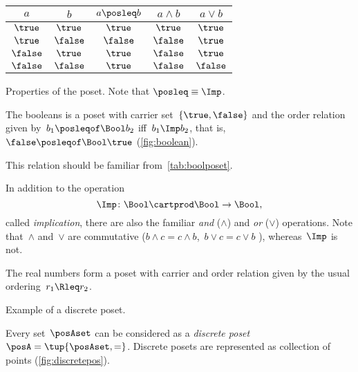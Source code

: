 \begin{margintable}
	\centering
	\begin{tabular}{cc|ccc}
		$a$      & $b$      & $a \posleq  b$ & $a \wedge b$ & $a \vee b$ \\ \hline
		$\true$  & $\true$  & $\true$        & $\true$      & $\true$    \\
		$\true$  & $\false$ & $\false$       & $\false$     & $\true$    \\
		$\false$ & $\true$  & $\true$        & $\false$     & $\true$    \\
		$\false$ & $\false$ & $\true$        & $\false$     & $\false$
	\end{tabular}
	\caption{Properties of the \Bool poset.
		Note that $\posleq \equiv \Imp$.
	}
	\label{tab:boolposet}
\end{margintable}

\begin{example}[Booleans]
	\label{ex:bool}
	The booleans \index{\Bool} is a poset with carrier set~$\{\true,\false\}$ and the order relation given by~$b_1 \posleqof\Bool b_2$ iff~$b_1 \Imp b_2$, that is,~$\false \posleqof\Bool \true$ (\cref{fig:boolean}).

	This relation should be familiar from~\cref{tab:boolposet}.

	In addition to the operation
	\begin{equation*}
		\Imp\colon\Bool\cartprod \Bool\to\Bool,
	\end{equation*}
	called \emph{implication}, there are also the familiar \emph{and} ($\wedge$) and \emph{or} ($\vee$) operations.
	Note that~$\wedge$ and~$\vee$ are commutative ($b\wedge c = c\wedge b$,~$b\vee c = c\vee b$ ), whereas~$\Imp$ is not.
\end{example}


\begin{example}[Reals]
	The real numbers \reals form a poset with carrier \reals and order relation given by the usual ordering~$r_1 \Rleq r_2$.
\end{example}

\begin{marginfigure}
	\centering
	\caption{Example of a discrete poset.}
	\label{fig:discretepos}
\end{marginfigure}

\begin{example}
	\label{ex:discreteposet}
	Every set~$\posAset$ can be considered as a \emph{discrete poset}~$\posA = \tup{\posAset,=}$.
	Discrete posets are represented as collection of points (\cref{fig:discretepos}).
\end{example}

